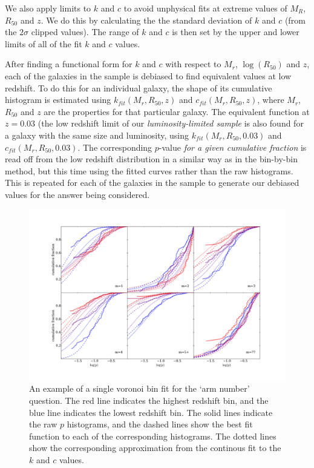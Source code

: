 \documentclass[useAMS,usenatbib]{mn2e}
\begin{document}
We also apply limits to $k$ and $c$ to avoid unphysical fits at extreme values of $M_R$, $R_{50}$ and $z$. We do this by calculating the the standard deviation of $k$ and $c$ (from the $2\sigma$ clipped values). The range of $k$ and $c$ is then set by the upper and lower limits of all of the fit $k$ and $c$ values.

After finding a functional form for $k$ and $c$ with respect to $M_r$, $\log(R_{50})$ and $z$, each of the galaxies in the sample is debiased to find equivalent values at low redshift. To do this for an individual galaxy, the shape of its cumulative histogram is estimated using $k_{fit}(M_r,R_{50},z)$ and $c_{fit}(M_r,R_{50},z)$, where $M_r$,$R_{50}$ and $z$ are the properties for that particular galaxy. The equivalent function at $z=0.03$ (the low redshift limit of our \textit{luminosity-limited sample} is also found for a galaxy with the same size and luminosity, using $k_{fit}(M_r,R_{50},0.03)$ and $c_{fit}(M_r,R_{50},0.03)$. The corresponding $p$-value \emph{for a given cumulative fraction} is read off from the low redshift distribution in a similar way as in the bin-by-bin method, but this time using the fitted curves rather than the raw histograms. This is repeated for each of the galaxies in the sample to generate our debiased values for the answer being considered.

\begin{figure}
		\centering

        \includegraphics[width=1\textwidth]{Images/Bias/Debiasing/vbin_fit.pdf}

        \caption{An example of a single voronoi bin fit for the `arm number' question. The red line indicates the highest redshift bin, and the blue line indicates the lowest redshift bin. The solid lines indicate the raw $p$ histograms, and the dashed lines show the best fit function to each of the corresponding histograms. The dotted lines show the corresponding approximation from the continous fit to the $k$ and $c$ values.}

        \label{fig:function_fit}

\end{figure}
\end{document}
